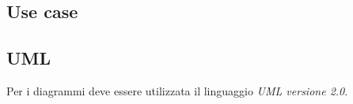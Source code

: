 \subsection{Use case}

\subsection{UML}

Per i diagrammi deve essere utilizzata il linguaggio \emph{UML versione 2.0}.